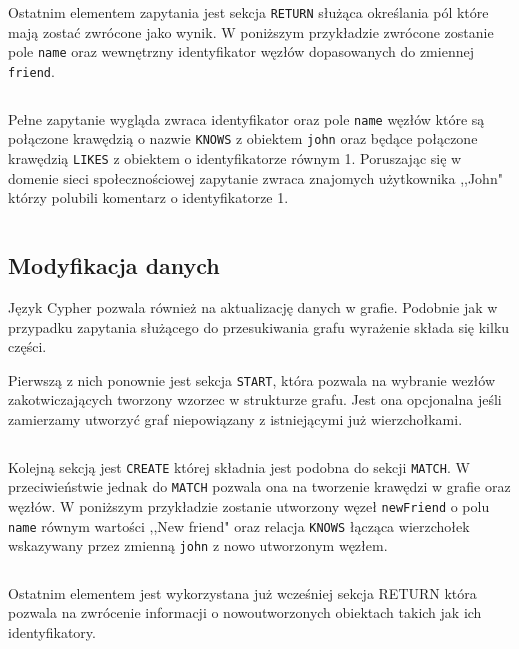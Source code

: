 \documentclass[brudnopis]{xmgr}
\begin{document}
\inputminted{cypher}{listings/cypher/match-section.cypher}

Ostatnim elementem zapytania jest sekcja \texttt{RETURN} służąca określania pól które mają zostać zwrócone jako wynik. W poniższym przykładzie zwrócone zostanie pole \texttt{name} oraz wewnętrzny identyfikator węzłów dopasowanych do zmiennej \texttt{friend}.

\inputminted{cypher}{listings/cypher/return-section.cypher}

Pełne zapytanie wygląda zwraca identyfikator oraz pole \texttt{name} węzłów które są połączone krawędzią o nazwie \texttt{KNOWS} z obiektem \texttt{john} oraz będące połączone krawędzią \texttt{LIKES} z obiektem o identyfikatorze równym {1}. Poruszając się w domenie sieci społecznościowej zapytanie zwraca znajomych użytkownika ,,John" którzy polubili komentarz o identyfikatorze {1}.

\inputminted{cypher}{listings/cypher/sample-query.cypher}

\subsection{Modyfikacja danych}

Język Cypher pozwala również na aktualizację danych w grafie. Podobnie jak w przypadku zapytania służącego do przesukiwania grafu wyrażenie składa się kilku części.

Pierwszą z nich ponownie jest sekcja \texttt{START}, która pozwala na wybranie wezłów zakotwiczających tworzony wzorzec w strukturze grafu. Jest ona opcjonalna jeśli zamierzamy utworzyć graf niepowiązany z istniejącymi już wierzchołkami.

\inputminted{cypher}{listings/cypher/start-section.cypher}

Kolejną sekcją jest \texttt{CREATE} której składnia jest podobna do sekcji \texttt{MATCH}. W przeciwieństwie jednak do \texttt{MATCH} pozwala ona na tworzenie krawędzi w grafie oraz węzłów. W poniższym przykładzie zostanie utworzony węzeł \texttt{newFriend} o polu \texttt{name} równym wartości ,,New friend" oraz relacja \texttt{KNOWS} łącząca wierzchołek wskazywany przez zmienną \texttt{john} z nowo utworzonym węzłem.

\inputminted{cypher}{listings/cypher/create-section.cypher}

Ostatnim elementem jest wykorzystana już wcześniej sekcja RETURN która pozwala na zwrócenie informacji o nowoutworzonych obiektach takich jak ich identyfikatory.
\end{document}
